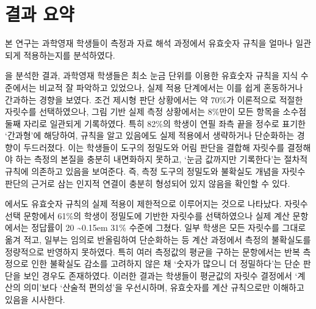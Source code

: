 \section{결과 요약}

본 연구는 과학영재 학생들이 측정과 자료 해석 과정에서 유효숫자 규칙을
얼마나 일관되게 적용하는지를 분석하였다.


을 분석한 결과,
%
과학영재 학생들은 최소 눈금 단위를 이용한 유효숫자 규칙을 지식 수준에서는 비교적
잘 파악하고 있었으나, 실제 적용 단계에서는 이를 쉽게 혼동하거나 간과하는 경향을 보였다.
%
조건 제시형 판단 상황에서는 약 70\%가 이론적으로 적절한 자릿수를 선택하였으나,
그림 기반 실제 측정 상황에서는 8\%만이 모든 항목을 소수점 둘째 자리로 일관되게 기록하였다.
%
특히 82\%의 학생이 연필 좌측 끝을 정수로 표기한 `간과형'에 해당하여,
규칙을 알고 있음에도 실제 적용에서 생략하거나 단순화하는 경향이 두드러졌다.
%
이는 학생들이 도구의 정밀도와 어림 판단을 결합해 자릿수를 결정해야 하는
측정의 본질을 충분히 내면화하지 못하고, `눈금 값까지만 기록한다'는
절차적 규칙에 의존하고 있음을 보여준다.
%
즉, 측정 도구의 정밀도와 불확실도 개념을 자릿수 판단의 근거로 삼는
인지적 연결이 충분히 형성되어 있지 않음을 확인할 수 있다.




에서도 유효숫자 규칙의 실제 적용이
제한적으로 이루어지는 것으로 나타났다.
%
자릿수 선택 문항에서 61\%의 학생이 정밀도에 기반한 자릿수를 선택하였으나
실제 계산 문항에서는 정답률이 20 \textasciitilde\kern0.15em 31\% 수준에 그쳤다.
%
일부 학생은 모든 자릿수를 그대로 옮겨 적고, 일부는 임의로 반올림하여 단순화하는 등
계산 과정에서 측정의 불확실도를 정량적으로 반영하지 못하였다.
%
특히 여러 측정값의 평균을 구하는 문항에서는 반복 측정으로 인한 불확실도 감소를 고려하지 않은 채
`숫자가 많으니 더 정밀하다'는 단순 판단을 보인 경우도 존재하였다.
%
이러한 결과는 학생들이 평균값의 자릿수 결정에서 `계산의 의미'보다 `산술적 편의성'을 우선시하며,
유효숫자를 계산 규칙으로만 이해하고 있음을 시사한다.



